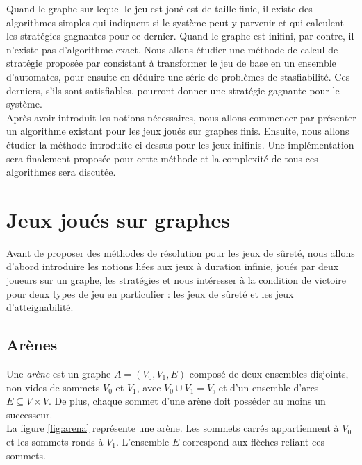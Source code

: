 \documentclass[12pt,a4paper,oneside,titlepage]{report}
\begin{document}
\noindent Quand le graphe sur lequel le jeu est joué est de taille finie, il existe des algorithmes simples qui indiquent si le système peut y parvenir et qui calculent les stratégies gagnantes pour ce dernier. Quand le graphe est inifini, par contre, il n'existe pas d'algorithme exact. Nous allons étudier une méthode de calcul de stratégie proposée par \cite{NeiderAutomaton} consistant à transformer le jeu de base en un ensemble d'automates, pour ensuite en déduire une série de problèmes de stasfiabilité. Ces derniers, s'ils sont satisfiables, pourront donner une stratégie gagnante pour le système.\\

\noindent Après avoir introduit les notions nécessaires, nous allons commencer par présenter un algorithme existant pour les jeux joués sur graphes finis. Ensuite, nous allons étudier la méthode introduite ci-dessus pour les jeux inifinis. Une implémentation sera finalement proposée pour cette méthode et la complexité de tous ces algorithmes sera discutée.
\newpage

\chapter{Jeux joués sur graphes}\label{ch:1}
\renewcommand{\leftmark}{CHAPITRE \thechapter.~~Jeux joués sur graphes}
Avant de proposer des méthodes de résolution pour les jeux de sûreté, nous allons d'abord introduire les notions liées aux jeux à duration infinie, joués par deux joueurs sur un graphe, les stratégies et nous intéresser à la condition de victoire pour deux types de jeu en particulier : les jeux de sûreté et les jeux d'atteignabilité. 
\section{Arènes}
Une \emph{arène} est un graphe $A = (V_0,V_1,E)$ composé de deux ensembles disjoints, non-vides de sommets $V_0$ et $V_1$, avec $V_0 \cup V_1 = V$, et d'un ensemble d'arcs $E \subseteq V\times V$. De plus, chaque sommet d'une arène doit posséder au moins un successeur.\\

\noindent La figure \ref{fig:arena} représente une arène. Les sommets carrés appartiennent à $V_0$ et les sommets ronds à $V_1$. L'ensemble $E$ correspond aux flèches reliant ces sommets.
\end{document}
